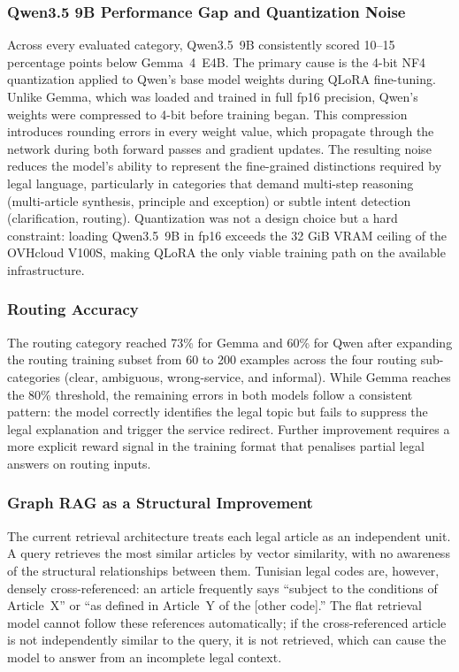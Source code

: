 \subsubsection{Qwen3.5 9B Performance Gap and Quantization Noise}

Across every evaluated category, Qwen3.5~9B consistently scored 10--15 percentage points below Gemma~4~E4B. The primary cause is the 4-bit NF4 quantization applied to Qwen's base model weights during QLoRA fine-tuning. Unlike Gemma, which was loaded and trained in full fp16 precision, Qwen's weights were compressed to 4-bit before training began. This compression introduces rounding errors in every weight value, which propagate through the network during both forward passes and gradient updates. The resulting noise reduces the model's ability to represent the fine-grained distinctions required by legal language, particularly in categories that demand multi-step reasoning (multi-article synthesis, principle and exception) or subtle intent detection (clarification, routing). Quantization was not a design choice but a hard constraint: loading Qwen3.5~9B in fp16 exceeds the 32 GiB VRAM ceiling of the OVHcloud V100S, making QLoRA the only viable training path on the available infrastructure.

\subsubsection{Routing Accuracy}

The routing category reached 73\% for Gemma and 60\% for Qwen after expanding the routing training subset from 60 to 200 examples across the four routing sub-categories (clear, ambiguous, wrong-service, and informal). While Gemma reaches the 80\% threshold, the remaining errors in both models follow a consistent pattern: the model correctly identifies the legal topic but fails to suppress the legal explanation and trigger the service redirect. Further improvement requires a more explicit reward signal in the training format that penalises partial legal answers on routing inputs.

\subsubsection{Graph RAG as a Structural Improvement}

The current retrieval architecture treats each legal article as an independent unit. A query retrieves the most similar articles by vector similarity, with no awareness of the structural relationships between them. Tunisian legal codes are, however, densely cross-referenced: an article frequently says ``subject to the conditions of Article~X'' or ``as defined in Article~Y of the [other code].'' The flat retrieval model cannot follow these references automatically; if the cross-referenced article is not independently similar to the query, it is not retrieved, which can cause the model to answer from an incomplete legal context.

